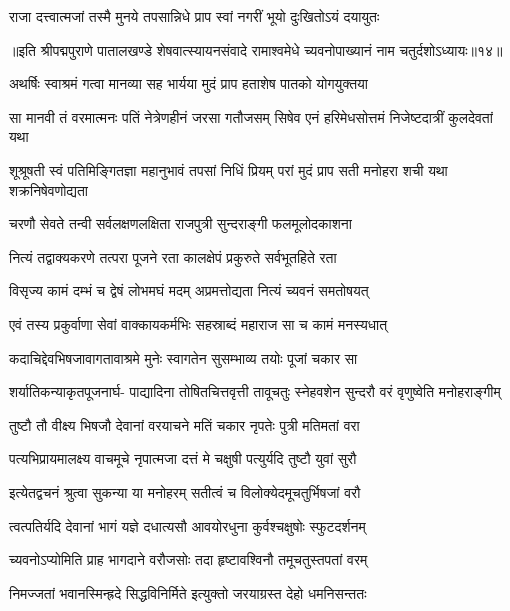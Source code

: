 \twolineshloka
{राजा दत्त्वात्मजां तस्मै मुनये तपसान्निधे}
{प्राप स्वां नगरीं भूयो दुःखितोऽयं दयायुतः}%

{॥इति श्रीपद्मपुराणे पातालखण्डे शेषवात्स्यायनसंवादे रामाश्वमेधे च्यवनोपाख्यानं नाम चतुर्दशोऽध्यायः॥१४॥}



\twolineshloka
{अथर्षिः स्वाश्रमं गत्वा मानव्या सह भार्यया}
{मुदं प्राप हताशेष पातको योगयुक्तया}%

\fourlineindentedshloka
{सा मानवी तं वरमात्मनः पतिं}
{नेत्रेणहीनं जरसा गतौजसम्}
{सिषेव एनं हरिमेधसोत्तमं}
{निजेष्टदात्रीं कुलदेवतां यथा}%

\fourlineindentedshloka
{शूश्रूषती स्वं पतिमिङ्गितज्ञा}
{महानुभावं तपसां निधिं प्रियम्}
{परां मुदं प्राप सती मनोहरा}
{शची यथा शक्रनिषेवणोद्यता}%

\twolineshloka
{चरणौ सेवते तन्वी सर्वलक्षणलक्षिता}
{राजपुत्री सुन्दराङ्गी फलमूलोदकाशना}%

\twolineshloka
{नित्यं तद्वाक्यकरणे तत्परा पूजने रता}
{कालक्षेपं प्रकुरुते सर्वभूतहिते रता}%

\twolineshloka
{विसृज्य कामं दम्भं च द्वेषं लोभमघं मदम्}
{अप्रमत्तोद्यता नित्यं च्यवनं समतोषयत्}%

\twolineshloka
{एवं तस्य प्रकुर्वाणा सेवां वाक्कायकर्मभिः}
{सहस्राब्दं महाराज सा च कामं मनस्यधात्}%

\twolineshloka
{कदाचिद्देवभिषजावागतावाश्रमे मुनेः}
{स्वागतेन सुसम्भाव्य तयोः पूजां चकार सा}%

\fourlineindentedshloka
{शर्यातिकन्याकृतपूजनार्घ-}
{पाद्यादिना तोषितचित्तवृत्ती}
{तावूचतुः स्नेहवशेन सुन्दरौ}
{वरं वृणुष्वेति मनोहराङ्गीम्}%

\twolineshloka
{तुष्टौ तौ वीक्ष्य भिषजौ देवानां वरयाचने}
{मतिं चकार नृपतेः पुत्री मतिमतां वरा}%

\twolineshloka
{पत्यभिप्रायमालक्ष्य वाचमूचे नृपात्मजा}
{दत्तं मे चक्षुषी पत्युर्यदि तुष्टौ युवां सुरौ}%

\twolineshloka
{इत्येतद्वचनं श्रुत्वा सुकन्या या मनोहरम्}
{सतीत्वं च विलोक्येदमूचतुर्भिषजां वरौ}%

\twolineshloka
{त्वत्पतिर्यदि देवानां भागं यज्ञे दधात्यसौ}
{आवयोरधुना कुर्वश्चक्षुषोः स्फुटदर्शनम्}%

\twolineshloka
{च्यवनोऽप्योमिति प्राह भागदाने वरौजसोः}
{तदा हृष्टावश्विनौ तमूचतुस्तपतां वरम्}%

\twolineshloka
{निमज्जतां भवानस्मिन्ह्रदे सिद्धविनिर्मिते}
{इत्युक्तो जरयाग्रस्त देहो धमनिसन्ततः}%

